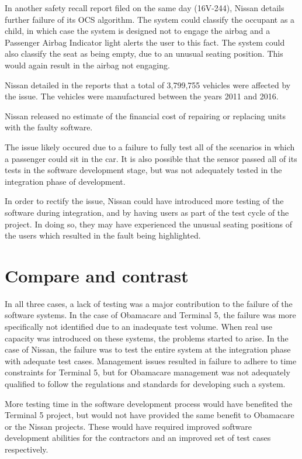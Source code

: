 \documentclass[a4paper,12pt]{article}
\begin{document}
In another safety recall report filed on the same day (16V-244), Nissan details further failure of its OCS algorithm. The system could classify the occupant as a child, in which case the system is designed not to engage the airbag and a Passenger Airbag Indicator light alerts the user to this fact. The system could also classify the seat as being empty, due to an unusual seating position. This would again result in the airbag not engaging.

Nissan detailed in the reports that a total of 3,799,755 vehicles were affected by the issue. The vehicles were manufactured between the years 2011 and 2016.

Nissan released no estimate of the financial cost of repairing or replacing units with the faulty software.

The issue likely occured due to a failure to fully test all of the scenarios in which a passenger could sit in the car. It is also possible that the sensor passed all of its tests in the software development stage, but was not adequately tested in the integration phase of development.

In order to rectify the issue, Nissan could have introduced more testing of the software during integration, and by having users as part of the test cycle of the project. In doing so, they may have experienced the unusual seating positions of the users which resulted in the fault being highlighted.

\section{Compare and contrast}
In all three cases, a lack of testing was a major contribution to the failure of the software systems. In the case of Obamacare and Terminal 5, the failure was more specifically not identified due to an inadequate test volume. When real use capacity was introduced on these systems, the problems started to arise. In the case of Nissan, the failure was to test the entire system at the integration phase with adequate test cases. Management issues resulted in failure to adhere to time constraints for Terminal 5, but for Obamacare management was not adequately qualified to follow the regulations and standards for developing such a system.

More testing time in the software development process would have benefited the Terminal 5 project, but would not have provided the same benefit to Obamacare or the Nissan projects. These would have required improved software development abilities for the contractors and an improved set of test cases respectively.
\end{document}
